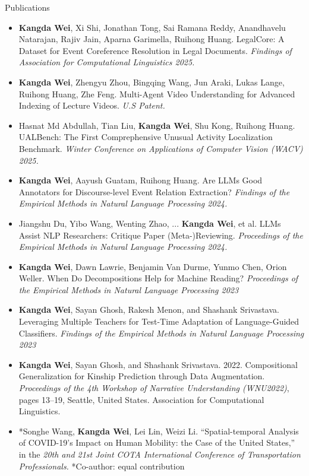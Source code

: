 \documentclass[a4paper, 12pt]{resume} %
\begin{document}
\begin{rSection}{Publications}
\begin{itemize}[noitemsep, topsep=0pt, leftmargin=*]
\item {\bf Kangda Wei}, Xi Shi, Jonathan Tong, Sai Ramana Reddy, Anandhavelu Natarajan, Rajiv Jain, Aparna Garimella, Ruihong Huang. LegalCore: A Dataset for Event Coreference Resolution in Legal Documents. {\em Findings of Association for Computational Linguistics 2025.}
\item {\bf Kangda Wei}, Zhengyu Zhou, Bingqing Wang, Jun Araki, Lukas Lange, Ruihong Huang, Zhe Feng. Multi-Agent Video Understanding for Advanced Indexing of Lecture Videos. {\em U.S Patent.}
\item Hasnat Md Abdullah, Tian Liu, {\bf Kangda Wei}, Shu Kong, Ruihong Huang. UALBench: The First Comprephensive Unusual Activity Localization Benchmark. {\em Winter Conference on Applications of Computer Vision (WACV) 2025.}
\item {\bf Kangda Wei}, Aayush Guatam, Ruihong Huang. Are LLMs Good Annotators for Discourse-level Event Relation Extraction? {\em Findings of the Empirical Methods in Natural Language Processing 2024.}
\item Jiangshu Du, Yibo Wang, Wenting Zhao, ... {\bf Kangda Wei}, et al. LLMs Assist NLP Researchers: Critique Paper (Meta-)Reviewing. {\em Proceedings of the Empirical Methods in Natural Language Processing 2024.}
\item {\bf Kangda Wei}, Dawn Lawrie, Benjamin Van Durme, Yunmo Chen, Orion Weller. When Do Decompositions Help for Machine Reading? {\em Proceedings of the Empirical Methods in Natural Language Processing 2023}
\item {\bf Kangda Wei}, Sayan Ghosh, Rakesh Menon, and Shashank Srivastava. Leveraging Multiple Teachers for Test-Time Adaptation of Language-Guided Classifiers. {\em Findings of the Empirical Methods in Natural Language Processing 2023}
\item {\bf Kangda Wei}, Sayan Ghosh, and Shashank Srivastava. 2022. Compositional Generalization for Kinship Prediction through Data Augmentation. {\em Proceedings of the 4th Workshop of Narrative Understanding (WNU2022)}, pages 13–19, Seattle, United States. Association for Computational Linguistics.
\item *Songhe Wang, {\bf *Kangda Wei}, Lei Lin, Weizi Li. “Spatial-temporal Analysis of COVID-19's Impact on Human Mobility: the Case of the United States,” in the {\em 20th and 21st Joint COTA International Conference of Transportation Professionals.} *Co-author: equal contribution
\end{itemize}
\end{rSection}
\end{document}
